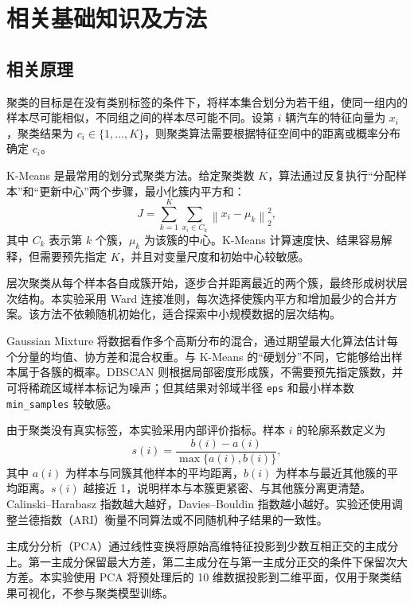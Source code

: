 \documentclass[UTF8,a4paper,12pt]{ctexart}
\begin{document}
\section{相关基础知识及方法}

\subsection{相关原理}

聚类的目标是在没有类别标签的条件下，将样本集合划分为若干组，使同一组内的样本尽可能相似，不同组之间的样本尽可能不同。设第 $i$ 辆汽车的特征向量为 $x_i$，聚类结果为 $c_i\in\{1,\ldots,K\}$，则聚类算法需要根据特征空间中的距离或概率分布确定 $c_i$。

K-Means 是最常用的划分式聚类方法。给定聚类数 $K$，算法通过反复执行“分配样本”和“更新中心”两个步骤，最小化簇内平方和：
\begin{equation}
    J=\sum_{k=1}^{K}\sum_{x_i\in C_k}\left\|x_i-\mu_k\right\|_2^2,
\end{equation}
其中 $C_k$ 表示第 $k$ 个簇，$\mu_k$ 为该簇的中心。K-Means 计算速度快、结果容易解释，但需要预先指定 $K$，并且对变量尺度和初始中心较敏感。

层次聚类从每个样本各自成簇开始，逐步合并距离最近的两个簇，最终形成树状层次结构。本实验采用 Ward 连接准则，每次选择使簇内平方和增加最少的合并方案。该方法不依赖随机初始化，适合探索中小规模数据的层次结构。

Gaussian Mixture 将数据看作多个高斯分布的混合，通过期望最大化算法估计每个分量的均值、协方差和混合权重。与 K-Means 的“硬划分”不同，它能够给出样本属于各簇的概率。DBSCAN 则根据局部密度形成簇，不需要预先指定簇数，并可将稀疏区域样本标记为噪声；但其结果对邻域半径 \texttt{eps} 和最小样本数 \texttt{min\_samples} 较敏感。

由于聚类没有真实标签，本实验采用内部评价指标。样本 $i$ 的轮廓系数定义为
\begin{equation}
    s(i)=\frac{b(i)-a(i)}{\max\{a(i),b(i)\}},
\end{equation}
其中 $a(i)$ 为样本与同簇其他样本的平均距离，$b(i)$ 为样本与最近其他簇的平均距离。$s(i)$ 越接近 1，说明样本与本簇更紧密、与其他簇分离更清楚。Calinski--Harabasz 指数越大越好，Davies--Bouldin 指数越小越好。实验还使用调整兰德指数（ARI）衡量不同算法或不同随机种子结果的一致性。

主成分分析（PCA）通过线性变换将原始高维特征投影到少数互相正交的主成分上。第一主成分保留最大方差，第二主成分在与第一主成分正交的条件下保留次大方差。本实验使用 PCA 将预处理后的 10 维数据投影到二维平面，仅用于聚类结果可视化，不参与聚类模型训练。
\end{document}
